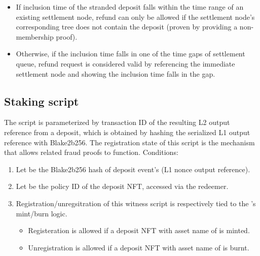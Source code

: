 \documentclass[../midgard.tex]{subfiles}
\begin{document}
\begin{description}
\begin{enumerate}
\begin{itemize}
          \item If inclusion time of the stranded deposit falls within the time range of an existing settlement node, refund can only be allowed if the settlement node's corresponding tree does not contain the deposit (proven by providing a non-membership proof).
          \item Otherwise, if the inclusion time falls in one of the time gaps of settlement queue, refund request is considered valid by referencing the immediate settlement node and showing the inclusion time falls in the gap.
        \end{itemize}
    \end{enumerate}
\end{description}

\subsection{Staking script}
\label{h:deposit-staking-script}
The  script is parameterized by transaction ID of the resulting L2 output reference from a deposit, which is obtained by hashing the serialized L1 output reference with Blake2b256.
The registration state of this script is the mechanism that allows related fraud proofs to function.
Conditions:

\begin{enumerate}
  \item Let  be the Blake2b256 hash of deposit event's  (L1 nonce output reference).
  \item Let  be the policy ID of the deposit NFT, accessed via the redeemer.
  \item Registration/unregsitration of this witness script is respectively tied to the 's mint/burn logic. 
    \begin{itemize}
      \item Registeration is allowed if a deposit NFT with asset name of  is minted.
      \item Unregistration is allowed if a deposit NFT with asset name of  is burnt.
    \end{itemize}
\end{enumerate}
\end{document}
